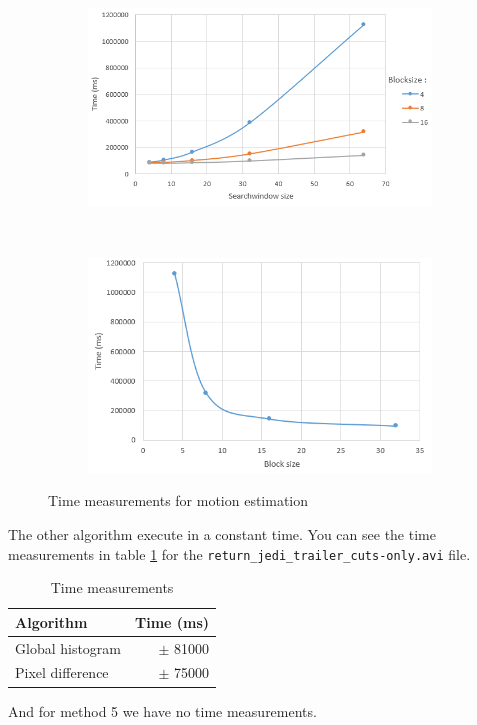 \documentclass[a4paper,11pt,oneside]{article}
\begin{document}
\begin{figure}[H]
        \begin{subfigure}[h]{0.5\textwidth}
                \includegraphics[width=\textwidth]{img/time_motion_1.png}
                \caption{ }\label{subfig:1}
        \end{subfigure}%
        ~
        \begin{subfigure}[h]{0.5\textwidth}
                \includegraphics[width=\textwidth]{img/time_motion_2.png}
                \caption{ }\label{subfig:2}
        \end{subfigure}
        \caption{Time measurements for motion estimation}\label{fig:time_motion}
\end{figure}
The other algorithm execute in a constant time. You can see the time measurements in table \ref{tab:times} for the \verb!return_jedi_trailer_cuts-only.avi! file.
\begin{table}[H]
\centering
\begin{tabular}{l|r}
Algorithm & Time (ms)\\
\hline
Global histogram & $\pm$ 81000\\
Pixel difference & $\pm$ 75000\\
\end{tabular}
\caption{Time measurements}
\label{tab:times}
\end{table}
And for method 5 we have no time measurements.
\end{document}
